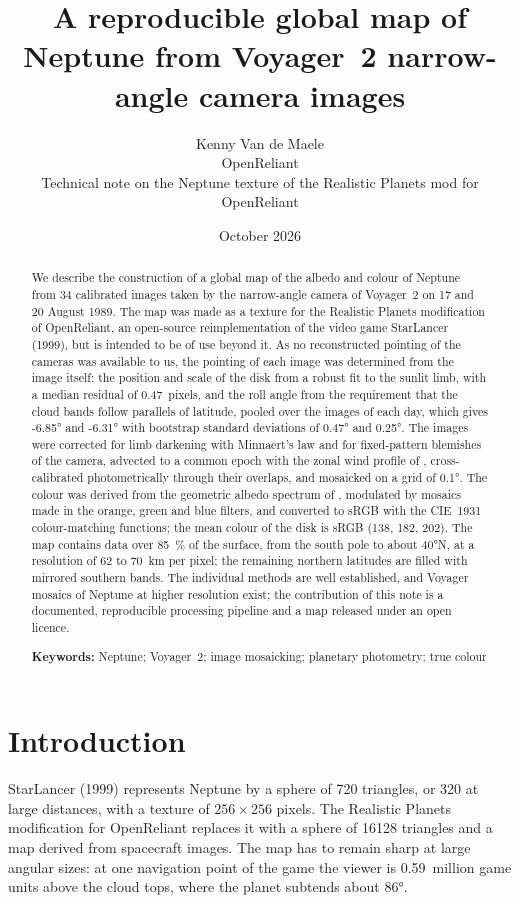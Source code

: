 \documentclass[11pt,a4paper]{article}
\title{A reproducible global map of Neptune from Voyager~2 narrow-angle camera images}
\author{Kenny Van de Maele\\[2pt]
  \small OpenReliant\\[6pt]
  \small Technical note on the Neptune texture of the Realistic Planets mod for OpenReliant}
\date{October 2026}
\begin{document}
\maketitle

\begin{abstract}
\noindent
We describe the construction of a global map of the albedo and colour of Neptune from 34
calibrated images taken by the narrow-angle camera of Voyager~2 on 17 and 20 August 1989. The map
was made as a texture for the Realistic Planets modification of OpenReliant, an open-source
reimplementation of the video game StarLancer (1999), but is intended to be of use beyond it. As no
reconstructed pointing of the cameras was available to us, the pointing of each image was determined
from the image itself: the position and scale of the disk from a robust fit to the sunlit limb, with
a median residual of 0.47~pixels, and the roll angle from the requirement that the cloud bands
follow parallels of latitude, pooled over the images of each day, which gives \ang{-6.85} and
\ang{-6.31} with bootstrap standard deviations of \ang{0.47} and \ang{0.25}. The images were
corrected for limb darkening with Minnaert's law and for fixed-pattern blemishes of the camera,
advected to a common epoch with the zonal wind profile of \citet{sromovsky1993}, cross-calibrated
photometrically through their overlaps, and mosaicked on a grid of \ang{0.1}. The colour was
derived from the geometric albedo spectrum of \citet{karkoschka1994}, modulated by mosaics made in
the orange, green and blue filters, and converted to sRGB with the CIE~1931 colour-matching
functions; the mean colour of the disk is sRGB (138, 182, 202). The map contains data over
\SI{85}{\percent} of the surface, from the south pole to about \ang{40}N, at a resolution of 62 to
70~km per pixel; the remaining northern latitudes are filled with mirrored southern bands. The
individual methods are well established, and Voyager mosaics of Neptune at higher resolution exist;
the contribution of this note is a documented, reproducible processing pipeline and a map released
under an open licence.

\medskip\noindent\textbf{Keywords:} Neptune; Voyager~2; image mosaicking; planetary photometry;
true colour
\end{abstract}

\section{Introduction}

StarLancer (1999) represents Neptune by a sphere of 720 triangles, or 320 at large distances, with
a texture of $256\times256$ pixels. The Realistic Planets modification for OpenReliant replaces it
with a sphere of \num{16128} triangles and a map derived from spacecraft images. The map has to
remain sharp at large angular sizes: at one navigation point of the game the viewer is 0.59~million
game units above the cloud tops, where the planet subtends about \ang{86}.
\end{document}
